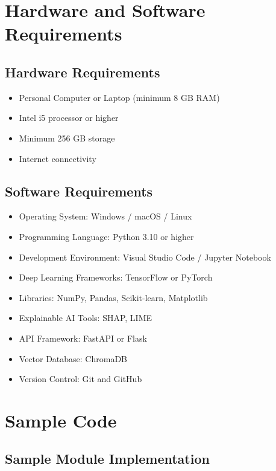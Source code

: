 \documentclass[12pt,a4paper]{report}
\begin{document}
\chapter{Hardware and Software Requirements}

\section{Hardware Requirements}

\begin{itemize}
    \item Personal Computer or Laptop (minimum 8 GB RAM)
    \item Intel i5 processor or higher
    \item Minimum 256 GB storage
    \item Internet connectivity
\end{itemize}

\section{Software Requirements}

\begin{itemize}
    \item Operating System: Windows / macOS / Linux
    \item Programming Language: Python 3.10 or higher
    \item Development Environment: Visual Studio Code / Jupyter Notebook
    \item Deep Learning Frameworks: TensorFlow or PyTorch
    \item Libraries: NumPy, Pandas, Scikit-learn, Matplotlib
    \item Explainable AI Tools: SHAP, LIME
    \item API Framework: FastAPI or Flask
    \item Vector Database: ChromaDB
    \item Version Control: Git and GitHub
\end{itemize}

\chapter{Sample Code}

\section{Sample Module Implementation}
\end{document}
